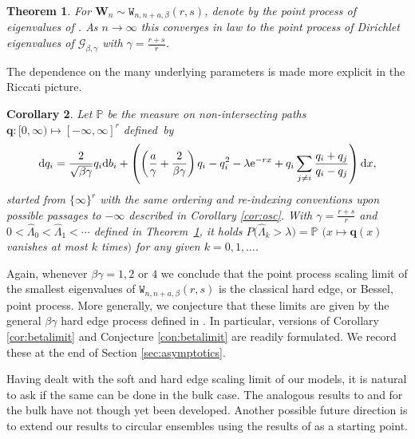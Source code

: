 \documentclass[pdftex]{sigma}
\numberwithin{equation}{section}
\newtheorem{Theorem}{Theorem}[section]
\newtheorem{Corollary}[Theorem]{Corollary}
\theoremstyle{definition}
\newcommand{\mbf}[1]{\mathbf{#1}}
\begin{document}
\begin{Theorem}
 \label{thm:limit_op1} For $\mbf{W}_n \sim \mathtt{W}_{ n, n+a, \beta}(r, s)$, denote by
  the point process of eigenvalues of \smash{$ \frac{rn}{\gamma} \mbf{W}_n$}.
As $n \rightarrow \infty$ this converges in law to the point process
of
Dirichlet eigenvalues of $ \mathcal{G}_{\beta, \gamma}$
with $\gamma = \frac{r+s}{r}$.
\end{Theorem}

The dependence on the many underlying parameters is made more explicit in the Riccati picture.

\begin{Corollary}
\label{cor:osc1}
Let $\mathbb{P}$ be the measure on non-intersecting paths ${\mathbf{q}}\colon [0, \infty) \mapsto [-\infty, \infty]^r$
defined~by
\begin{equation*}
\label{rrq}
 {\rm d} q_{i} = \frac{2}{\sqrt{\beta \gamma}} q_{i} {\rm d} b_i + \left( \left(\frac{a}{\gamma} + \frac{2}{\beta \gamma}\right) q_{i} - q_{i}^2 - \lambda {\rm e}^{-r x} + q_{i} \sum_{j \neq i} \frac{ q_{i} + q_{j}}{ q_{i}- q_{j} } \right) {\rm d} x,
\end{equation*}
started from $\{ \infty\}^r$ with the same ordering and re-indexing conventions upon possible passages to $-\infty$ described in
Corollary {\rm\ref{cor:osc}}. With $\gamma =\frac{r+s}{r}$ and $0 < \hat{\Lambda}_0< \hat{\Lambda}_1 <\cdots $ defined in Theorem~{\rm\ref{thm:limit_op1}},
it holds
$ P \bigl(\hat{\Lambda}_k > \lambda\bigr) = \mathbb{P}$ $( x \mapsto \mbf{q}(x)$ vanishes at most $ k $ times$)$
for any given $k = 0,1,\dots$.
\end{Corollary}

Again, whenever $\beta \gamma = 1, 2$ or $4$ we conclude that the point process scaling limit of the smallest eigenvalues of ${\mathtt{W}}_{n, n+a,\beta} (r, s)$ is the classical hard edge, or Bessel, point process. More generally,
we conjecture that these limits are given by the general $\beta \gamma$ hard edge process
defined in \cite{RR}. In particular, versions of Corollary \ref{cor:betalimit} and Conjecture \ref{con:betalimit} are readily formulated. We record these at the end of Section \ref{sec:asymptotics}.

 Having dealt with the soft and hard edge scaling limit of our models, it is natural to ask if the same can be done in the bulk case. The analogous results to \cite{Spike2} and \cite{RR2} for the bulk have not though yet been developed.
Another possible future direction is to extend our results to circular ensembles using the results of \cite{KillipNenciu} as a starting point.
\end{document}
